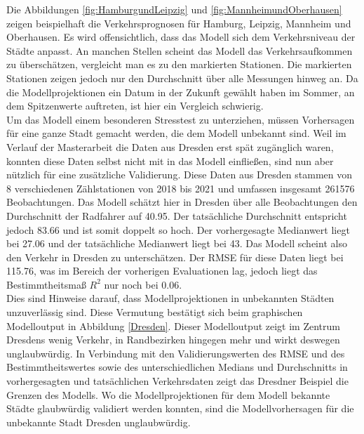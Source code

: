 \documentclass[a4paper,12pt]{thesis}
\begin{document}
Die Abbildungen \ref{fig:HamburgundLeipzig} und \ref{fig:MannheimundOberhausen} zeigen beispielhaft die Verkehrsprognosen für Hamburg, Leipzig, Mannheim und Oberhausen. Es wird offensichtlich, dass das Modell sich dem Verkehrsniveau der Städte anpasst. An manchen Stellen scheint das Modell das Verkehrsaufkommen zu überschätzen, vergleicht man es zu den markierten Stationen. Die markierten Stationen zeigen jedoch nur den Durchschnitt über alle Messungen hinweg an. Da die Modellprojektionen ein Datum in der Zukunft gewählt haben im Sommer, an dem Spitzenwerte auftreten, ist hier ein Vergleich schwierig.\\
Um das Modell einem besonderen Stresstest zu unterziehen, müssen Vorhersagen für eine ganze Stadt gemacht werden, die dem Modell unbekannt sind. Weil im Verlauf der Masterarbeit die Daten aus Dresden erst spät zugänglich waren, konnten diese Daten selbst nicht mit in das Modell einfließen, sind nun aber nützlich für eine zusätzliche Validierung. Diese Daten aus Dresden stammen von 8 verschiedenen Zählstationen von 2018 bis 2021 und umfassen insgesamt 261576 Beobachtungen. Das Modell schätzt hier in Dresden über alle Beobachtungen den Durchschnitt der Radfahrer auf 40.95. Der tatsächliche Durchschnitt entspricht jedoch 83.66 und ist somit doppelt so hoch. Der vorhergesagte Medianwert liegt bei 27.06 und der tatsächliche Medianwert liegt bei 43. Das Modell scheint also den Verkehr in Dresden zu unterschätzen. Der RMSE für diese Daten liegt bei 115.76, was im Bereich der vorherigen Evaluationen lag, jedoch liegt das Bestimmtheitsmaß $R^2$ nur noch bei 0.06.\\
Dies sind Hinweise darauf, dass Modellprojektionen in unbekannten Städten unzuverlässig sind. Diese Vermutung bestätigt sich beim graphischen Modelloutput in Abbildung \ref{Dresden}. Dieser Modelloutput zeigt im Zentrum Dresdens wenig Verkehr, in Randbezirken hingegen mehr und wirkt deswegen unglaubwürdig. In Verbindung mit den Validierungswerten des RMSE und des Bestimmtheitswertes sowie des unterschiedlichen Medians und Durchschnitts in vorhergesagten und tatsächlichen Verkehrsdaten zeigt das Dresdner Beispiel die Grenzen des Modells. Wo die Modellprojektionen für dem Modell bekannte Städte glaubwürdig validiert werden konnten, sind die Modellvorhersagen für die unbekannte Stadt Dresden unglaubwürdig.
\end{document}

